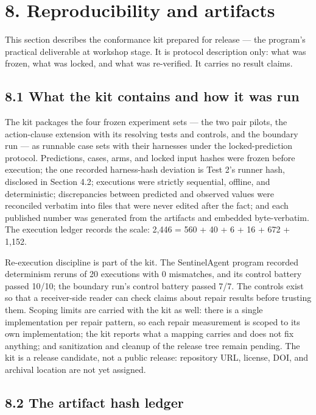 \documentclass[
  10pt,
]{article}
\renewcommand{\_}{\origunderscore\allowbreak}
\begin{document}
\section{8. Reproducibility and
artifacts}\label{reproducibility-and-artifacts}

This section describes the conformance kit prepared for release --- the
program's practical deliverable at workshop stage. It is protocol
description only: what was frozen, what was locked, and what was
re-verified. It carries no result claims.

\subsection{8.1 What the kit contains and how it was
run}\label{what-the-kit-contains-and-how-it-was-run}

The kit packages the four frozen experiment sets --- the two pair
pilots, the action-clause extension with its resolving tests and
controls, and the boundary run --- as runnable case sets with their
harnesses under the locked-prediction protocol. Predictions, cases,
arms, and locked input hashes were frozen before execution; the one
recorded harness-hash deviation is Test 2's runner hash, disclosed in
Section 4.2; executions were strictly sequential, offline, and
deterministic; discrepancies between predicted and observed values were
reconciled verbatim into files that were never edited after the fact;
and each published number was generated from the artifacts and embedded
byte-verbatim. The execution ledger records the scale: 2,446 = 560 + 40
+ 6 + 16 + 672 + 1,152.

Re-execution discipline is part of the kit. The SentinelAgent program
recorded determinism reruns of 20 executions with 0 mismatches, and its
control battery passed 10/10; the boundary run's control battery passed
7/7. The controls exist so that a receiver-side reader can check claims
about repair results before trusting them. Scoping limits are carried
with the kit as well: there is a single implementation per repair
pattern, so each repair measurement is scoped to its own implementation;
the kit reports what a mapping carries and does not fix anything; and
sanitization and cleanup of the release tree remain pending. The kit is
a release candidate, not a public release: repository URL, license, DOI,
and archival location are not yet assigned.

\subsection{8.2 The artifact hash
ledger}\label{the-artifact-hash-ledger}
\end{document}
